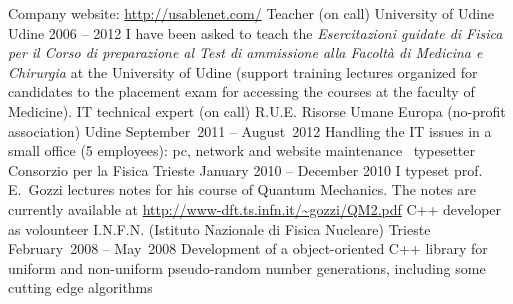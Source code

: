 \begin{cventries}
{%
Company website: \url{http://usablenet.com/}}
\cventry
{Teacher (on call)}
{University of Udine}
{Udine}
{2006 -- 2012}
{
   I have been asked to teach  the \emph{Esercitazioni guidate di Fisica per il Corso
      di preparazione al Test di ammissione alla Facolt\`a di Medicina e
      Chirurgia} at the University of Udine (support training lectures
   organized
for candidates to the placement exam for accessing the courses at the faculty
of Medicine).
}
\cventry
{IT technical expert (on call)}
{R.U.E. Risorse Umane Europa (no-profit
   association)}
{Udine}
{September~2011 -- August~2012}
{
   Handling the IT issues in a small office (5 employees): pc, network and
   website maintenance}
\cventry
{\LaTeXe\ typesetter}
{Consorzio per la Fisica}
{Trieste}
{January 2010 -- December 2010}
{   I typeset prof. E.~Gozzi lectures notes for his course of Quantum Mechanics.
   The notes are currently available at 
   \url{http://www-dft.ts.infn.it/~gozzi/QM2.pdf}}
\cventry
{C++ developer as volounteer}
{I.N.F.N. (Istituto Nazionale di Fisica
   Nucleare)}
{Trieste}
{February~2008 -- May~2008}
{Development of a object-oriented C++ library for uniform and non-uniform
   pseudo-random number generations, including some cutting edge algorithms}

\end{cventries}
